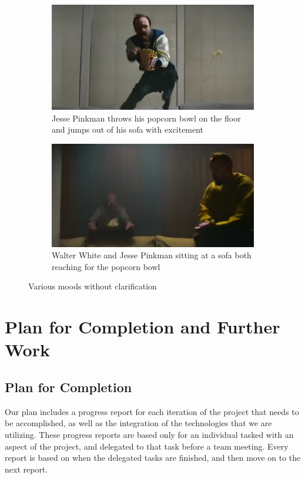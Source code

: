 \documentclass[conference]{IEEEtran}
\begin{document}
\begin{figure}[h]
    \centering
    \begin{subfigure}[b]{0.5\textwidth}
        \centering
        \includegraphics[width=\textwidth]{light.png}
        \caption{Jesse Pinkman throws his popcorn bowl on the floor and jumps out of his sofa with excitement}
    \end{subfigure}
    \begin{subfigure}[b]{0.5\textwidth}
        \centering
        \includegraphics[width=\textwidth]{dark.png}\caption{Walter White and Jesse Pinkman sitting at a sofa both reaching for the popcorn bowl}
    \end{subfigure}
    \caption{Various moods without clarification}
    \label{fig:mood}
\end{figure}


\section{Plan for Completion and Further Work}
\subsection{Plan for Completion}
Our plan includes a progress report for each iteration of the project that needs to be accomplished, as well as the integration of the technologies that we are utilizing. These progress reports are based only for an individual tasked with an aspect of the project, and delegated to that task before a team meeting. Every report is based on when the delegated tasks are finished, and then move on to the next report.
\end{document}
